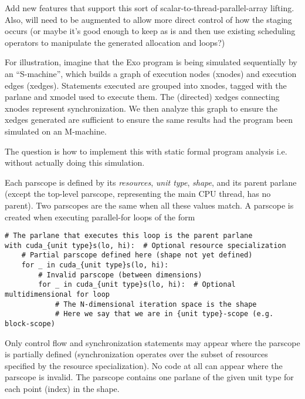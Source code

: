  Add new  features that support this sort of scalar-to-thread-parallel-array lifting.
Also,  will need to be augmented to allow more direct control of how the staging occurs
(or maybe it's good enough to keep as is and then use existing scheduling operators to manipulate the generated allocation and loops?)

\filbreak
{}

For illustration, imagine that the Exo program is being simulated sequentially by an ``S-machine'', which builds a graph of execution nodes (xnodes) and execution edges (xedges).
Statements executed are grouped into xnodes, tagged with the parlane and xmodel used to execute them.
The (directed) xedges connecting xnodes represent synchronization.
We then analyze this graph to ensure the xedges generated are sufficient to ensure the same results had the program been simulated on an M-machine.

The question is how to implement this with static formal program analysis i.e. without actually doing this simulation.

\filbreak
{} Each parscope is defined by its \textit{resources}, \textit{unit type}, \textit{shape}, and its parent parlane (except the top-level parscope, representing the main CPU thread, has no parent). Two parscopes are the same when all these values match. A parscope is created when executing parallel-for loops of the form

{\color{lightttColor}
\begin{verbatim}
# The parlane that executes this loop is the parent parlane
with cuda_{unit type}s(lo, hi):  # Optional resource specialization
    # Partial parscope defined here (shape not yet defined)
    for _ in cuda_{unit type}s(lo, hi):
        # Invalid parscope (between dimensions)
        for _ in cuda_{unit type}s(lo, hi):  # Optional multidimensional for loop
            # The N-dimensional iteration space is the shape
            # Here we say that we are in {unit type}-scope (e.g. block-scope)
\end{verbatim}
}

Only control flow and synchronization statements may appear where the parscope is partially defined (synchronization operates over the subset of resources specified by the resource specialization).
No code at all can appear where the parscope is invalid.
The parscope contains one parlane of the given unit type for each point (index) in the shape.

